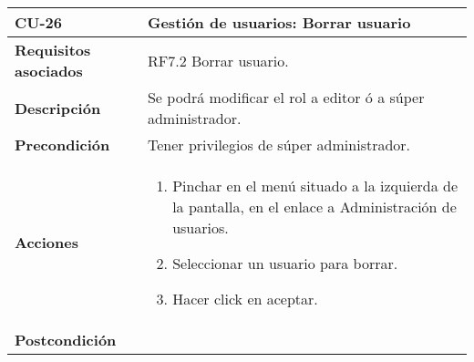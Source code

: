 \newpage
\begin{longtable}[t]{@{}ll@{}}
\toprule
\begin{minipage}[t]{0.23\columnwidth}\raggedright\strut
\textbf{CU-26}\strut
\end{minipage} & \begin{minipage}[b]{0.71\columnwidth}\raggedright\strut
\textbf{Gestión de usuarios: Borrar usuario}\strut
\end{minipage}\tabularnewline
\midrule
\endhead
\begin{minipage}[t]{0.23\columnwidth}\raggedright\strut
\textbf{Requisitos asociados}\strut
\end{minipage} & \begin{minipage}[t]{0.71\columnwidth}\raggedright\strut
RF7.2 Borrar usuario. \strut
\end{minipage}\tabularnewline
\begin{minipage}[t]{0.23\columnwidth}\raggedright\strut
\textbf{Descripción}\strut
\end{minipage} & \begin{minipage}[t]{0.71\columnwidth}\raggedright\strut
Se podrá modificar el rol a editor ó a súper administrador.
\strut
\end{minipage}\tabularnewline
\begin{minipage}[t]{0.23\columnwidth}\raggedright\strut
\textbf{Precondición}\strut
\end{minipage} & \begin{minipage}[t]{0.71\columnwidth}\raggedright\strut
Tener privilegios de súper administrador.\strut
\end{minipage}\tabularnewline
\begin{minipage}[t]{0.23\columnwidth}\raggedright\strut
\textbf{Acciones}\strut
\end{minipage} & \begin{minipage}[t]{0.71\columnwidth}\raggedright\strut
\begin{enumerate}
\def\labelenumi{\arabic{enumi}.}
\tightlist
\item
Pinchar en el menú situado a la izquierda de la pantalla, en el
enlace a Administración de usuarios.
\item
Seleccionar un usuario para borrar.
\item
Hacer click en aceptar.
\end{enumerate}\strut
\end{minipage}\tabularnewline
\begin{minipage}[t]{0.23\columnwidth}\raggedright\strut
\textbf{Postcondición}\strut

\end{minipage}
\end{longtable}

